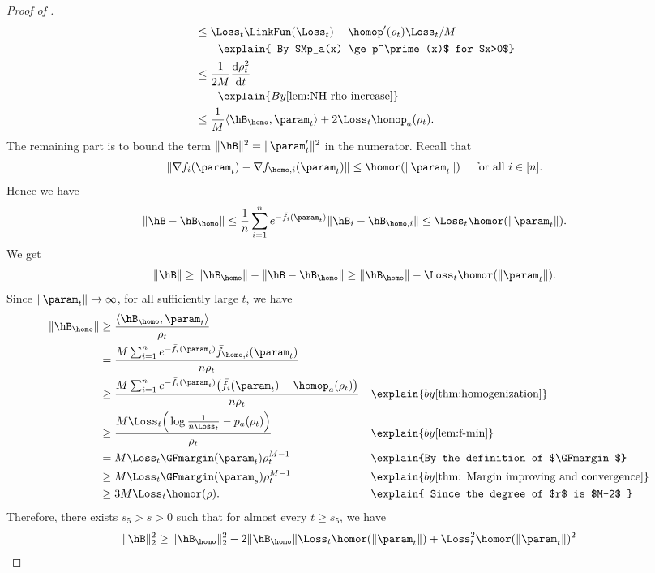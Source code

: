 \begin{proof}[Proof of ]
\begin{align}
    &\le \Loss_t \LinkFun(\Loss_t) - \homop^\prime (\rho_t) \Loss_t /M \notag\\ 
    &\qquad \explain{ By $Mp_a(x) \ge p^\prime (x)$ for $x>0$} \notag\\
    &\le \frac{1}{2M} \frac{\mathrm{d} \rho_t^2}{\mathrm{d}  t} \notag \\ 
    &\qquad \explain{ By \Cref{lem:NH-rho-increase}} \notag\\
    & \le \frac{1}{M}\langle \hB_{\homo}, \param_t \rangle + 2\Loss_t \homop_a(\rho_t).
\end{align}
The remaining part is to bound the term $\|\hB\|^2 = \| \param_t^\prime  \|^2$ in the numerator.  Recall that 
\[
    \| \nabla f_i(\param_t) - \nabla f_{\homo,i}(\param_t)\| \le\homor(\|\param_t\|)  \quad \text{ for all } i\in [n].
\]
Hence we have 
\[
    \|\hB - \hB_{\homo} \| \le \frac{1}{n} \sum_{i=1}^n e^{-\bar f_i(\param_t)} \| \hB_i - \hB_{\homo,i} \| \le \Loss_t\homor(\|\param_t\|).
\]
We get 
\[
    \|\hB\| \ge \|\hB_{\homo}\| - \| \hB - \hB_{\homo}\|  \ge \|\hB_{\homo}\| - \Loss_t\homor(\|\param_t\|).
\] 
Since $\|\param_t\| \to \infty$, for all sufficiently large $t$, we have 
\begin{align}
\| \hB_{\homo}\|
&\ge \frac{\langle \hB_{\homo}, \param_t \rangle }{\rho_t} 
\\
&= \frac{M\sum_{i=1}^{n} e^{-\bar f_i(\param_t)} \bar f_{\homo,i}(\param_t) }{n \rho_t}  \notag\\ 
& \ge  \frac{M \sum_{i=1}^{n} e^{-\bar f_i(\param_t)} \big (\bar f_i(\param_t) - \homop_a(\rho_t) \big) }{n \rho_t} 
&&\explain{ by \Cref{thm:homogenization}} 
\notag\\ 
& \ge \frac{M\Loss_t  \Big(\log \frac{1}{n \Loss_t} - p_a(\rho_t)\Big)}{\rho_t} 
&&\explain{ by \Cref{lem:f-min} } 
\\ 
&= M\Loss_t\GFmargin(\param_t) \rho_t^{M-1} 
&& \explain{By the definition of $\GFmargin$} 
\notag\\ 
&\ge M\Loss_t \GFmargin(\param_s) \rho_t^{M-1}  \label{eq: h_M lb} && \explain{by \Cref{thm: Margin improving and convergence}} \\ 
& \ge 3M\Loss_t\homor(\rho) \notag. &&\explain{ Since the degree of $r$ is $M-2$ } 
\end{align}
Therefore, there exists $s_5 > s>0$ such that for almost every $t\ge s_5$, we have 
\begin{align}
\label{eq: beta-bound-num1}
\|\hB\|_2^2 
&\ge  \|\hB_{\homo}\|_2^2 - 2\|\hB_{\homo}\| \Loss_t\homor(\|\param_t\|) + \Loss_t^2\homor(\|\param_t\|)^2 

\end{align}
\end{proof}
